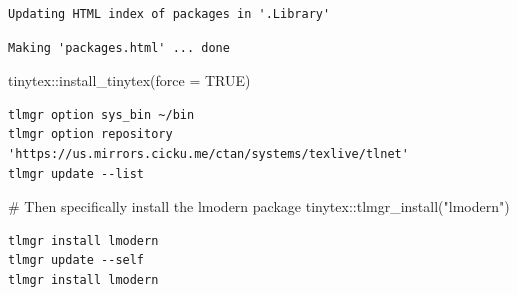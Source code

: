 \documentclass[
  letterpaper,
  DIV=11,
  numbers=noendperiod]{scrartcl}
\newenvironment{Shaded}{\begin{snugshade}}{\end{snugshade}}
\newcommand{\AttributeTok}[1]{\textcolor[rgb]{0.40,0.45,0.13}{#1}}
\newcommand{\CommentTok}[1]{\textcolor[rgb]{0.37,0.37,0.37}{#1}}
\newcommand{\ConstantTok}[1]{\textcolor[rgb]{0.56,0.35,0.01}{#1}}
\newcommand{\FunctionTok}[1]{\textcolor[rgb]{0.28,0.35,0.67}{#1}}
\newcommand{\NormalTok}[1]{\textcolor[rgb]{0.00,0.23,0.31}{#1}}
\newcommand{\SpecialCharTok}[1]{\textcolor[rgb]{0.37,0.37,0.37}{#1}}
\newcommand{\StringTok}[1]{\textcolor[rgb]{0.13,0.47,0.30}{#1}}
\begin{document}
\begin{verbatim}
Updating HTML index of packages in '.Library'
\end{verbatim}

\begin{verbatim}
Making 'packages.html' ... done
\end{verbatim}

\begin{Shaded}
\begin{Highlighting}[]
\NormalTok{tinytex}\SpecialCharTok{::}\FunctionTok{install\_tinytex}\NormalTok{(}\AttributeTok{force =} \ConstantTok{TRUE}\NormalTok{)}
\end{Highlighting}
\end{Shaded}

\begin{verbatim}
tlmgr option sys_bin ~/bin
tlmgr option repository 'https://us.mirrors.cicku.me/ctan/systems/texlive/tlnet'
tlmgr update --list
\end{verbatim}

\begin{Shaded}
\begin{Highlighting}[]
\CommentTok{\# Then specifically install the lmodern package}
\NormalTok{tinytex}\SpecialCharTok{::}\FunctionTok{tlmgr\_install}\NormalTok{(}\StringTok{"lmodern"}\NormalTok{)}
\end{Highlighting}
\end{Shaded}

\begin{verbatim}
tlmgr install lmodern
tlmgr update --self
tlmgr install lmodern
\end{verbatim}
\end{document}
